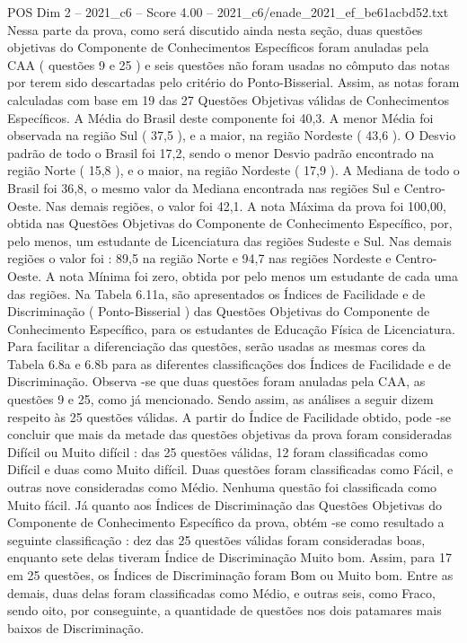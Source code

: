 \begin{textsample}{POS Dim 2 – 2021\_c6 – Score 4.00 – 2021\_c6/enade\_2021\_ef\_be61acbd52.txt}
Nessa parte da prova, como será discutido ainda nesta seção, duas questões objetivas do Componente de Conhecimentos Específicos foram anuladas pela CAA ( questões 9 e 25 ) e seis questões não foram usadas no cômputo das notas por terem sido descartadas pelo critério do Ponto-Bisserial.
Assim, as notas foram calculadas com base em 19 das 27 Questões Objetivas válidas de Conhecimentos Específicos.
A Média do Brasil deste componente foi 40,3.
A menor Média foi observada na região Sul ( 37,5 ), e a maior, na região Nordeste ( 43,6 ).
O Desvio padrão de todo o Brasil foi 17,2, sendo o menor Desvio padrão encontrado na região Norte ( 15,8 ), e o maior, na região Nordeste ( 17,9 ).
A Mediana de todo o Brasil foi 36,8, o mesmo valor da Mediana encontrada nas regiões Sul e Centro-Oeste.
Nas demais regiões, o valor foi 42,1.
A nota Máxima da prova foi 100,00, obtida nas Questões Objetivas do Componente de Conhecimento Específico, por, pelo menos, um estudante de Licenciatura das regiões Sudeste e Sul.
Nas demais regiões o valor foi : 89,5 na região Norte e 94,7 nas regiões Nordeste e Centro-Oeste.
A nota Mínima foi zero, obtida por pelo menos um estudante de cada uma das regiões.
Na Tabela 6.11a, são apresentados os Índices de Facilidade e de Discriminação ( Ponto-Bisserial ) das Questões Objetivas do Componente de Conhecimento Específico, para os estudantes de Educação Física de Licenciatura.
Para facilitar a diferenciação das questões, serão usadas as mesmas cores da Tabela 6.8a e 6.8b para as diferentes classificações dos Índices de Facilidade e de Discriminação.
Observa -se que duas questões foram anuladas pela CAA, as questões 9 e 25, como já mencionado.
Sendo assim, as análises a seguir dizem respeito às 25 questões válidas.
A partir do Índice de Facilidade obtido, pode -se concluir que mais da metade das questões objetivas da prova foram consideradas Difícil ou Muito difícil : das 25 questões válidas, 12 foram classificadas como Difícil e duas como Muito difícil.
Duas questões foram classificadas como Fácil, e outras nove consideradas como Médio.
Nenhuma questão foi classificada como Muito fácil.
Já quanto aos Índices de Discriminação das Questões Objetivas do Componente de Conhecimento Específico da prova, obtém -se como resultado a seguinte classificação : dez das 25 questões válidas foram consideradas boas, enquanto sete delas tiveram Índice de Discriminação Muito bom.
Assim, para 17 em 25 questões, os Índices de Discriminação foram Bom ou Muito bom.
Entre as demais, duas delas foram classificadas como Médio, e outras seis, como Fraco, sendo oito, por conseguinte, a quantidade de questões nos dois patamares mais baixos de Discriminação.

\end{textsample}
